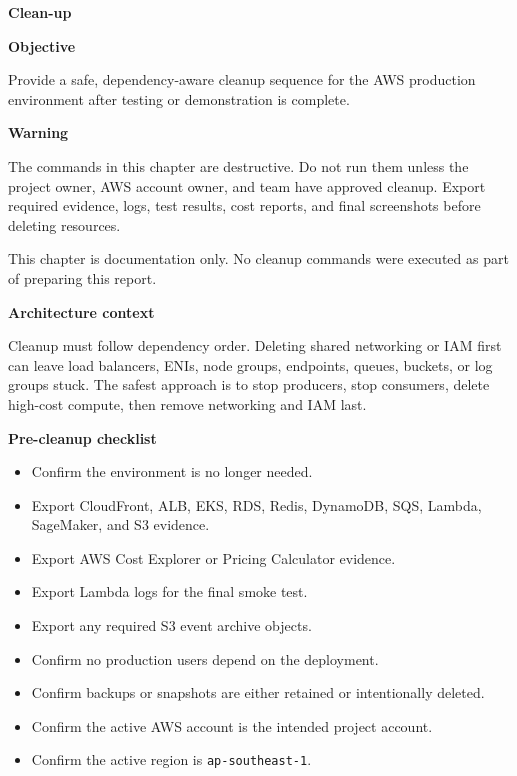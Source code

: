 \vspace{0.5em}\noindent\textbf{Clean-up}\par

\vspace{0.5em}\noindent\textbf{Objective}\par

Provide a safe, dependency-aware cleanup sequence for the AWS production
environment after testing or demonstration is complete.

\vspace{0.5em}\noindent\textbf{Warning}\par

The commands in this chapter are destructive. Do not run them unless the
project owner, AWS account owner, and team have approved cleanup. Export
required evidence, logs, test results, cost reports, and final
screenshots before deleting resources.

This chapter is documentation only. No cleanup commands were executed as
part of preparing this report.

\vspace{0.5em}\noindent\textbf{Architecture context}\par

Cleanup must follow dependency order. Deleting shared networking or IAM
first can leave load balancers, ENIs, node groups, endpoints, queues,
buckets, or log groups stuck. The safest approach is to stop producers,
stop consumers, delete high-cost compute, then remove networking and IAM
last.

\vspace{0.5em}\noindent\textbf{Pre-cleanup checklist}\par

\begin{itemize}
\tightlist
\item[$\square$]
  Confirm the environment is no longer needed.
\item[$\square$]
  Export CloudFront, ALB, EKS, RDS, Redis, DynamoDB, SQS, Lambda,
  SageMaker, and S3 evidence.
\item[$\square$]
  Export AWS Cost Explorer or Pricing Calculator evidence.
\item[$\square$]
  Export Lambda logs for the final smoke test.
\item[$\square$]
  Export any required S3 event archive objects.
\item[$\square$]
  Confirm no production users depend on the deployment.
\item[$\square$]
  Confirm backups or snapshots are either retained or intentionally
  deleted.
\item[$\square$]
  Confirm the active AWS account is the intended project account.
\item[$\square$]
  Confirm the active region is \texttt{ap-\allowbreak{}southeast-\allowbreak{}1}.
\end{itemize}

